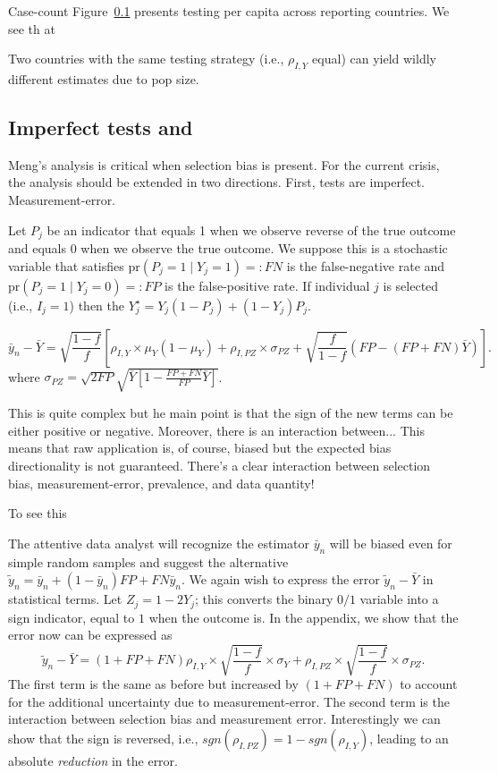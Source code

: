 \documentclass[12pt]{article}
\numberwithin{equation}{section}
\theoremstyle{plain}
\def\pr{\text{pr}}
\begin{document}
Case-count
Figure~\ref{} presents testing per capita across reporting countries.  We see th at

Two countries with the same testing strategy (i.e., $\rho_{I,Y}$ equal) can yield wildly different estimates due to pop size.

\subsection{Imperfect tests and }

Meng's analysis is critical when selection bias is present.  For the current crisis, the analysis should be extended in two directions.  First, tests are imperfect. Measurement-error.

Let $P_j$ be an indicator that equals 1 when we observe reverse of the true outcome and equals 0 when we observe the true outcome. We suppose this is a stochastic variable that satisfies $\pr(P_j = 1 \mid Y_j = 1) =: FN$ is the false-negative rate and $\pr(P_j = 1 \mid Y_j = 0) =: FP$ is the false-positive rate.  If individual $j$ is selected (i.e., $I_j = 1$) then the  $Y_j^\star = Y_j(1-P_j) + (1-Y_j) P_j$.

$$
\bar y_n - \bar Y = \sqrt{\frac{1-f}{f}} \left[ \rho_{I,Y} \times \mu_Y (1-\mu_Y) + \rho_{I,PZ} \times \sigma_{PZ} + \sqrt{\frac{f}{1-f}}  \left( FP - (FP+FN) \bar Y \right) \right] .
$$
where $\sigma_{PZ} = \sqrt{2 FP} \sqrt{\bar Y \left[ 1 - \frac{FP+FN}{FP} \bar Y \right]}$.

This is quite complex but he main point is that the sign of the new terms can be either positive or negative.  Moreover, there is an interaction between...
This means that raw application is, of course, biased but the expected bias directionality is not guaranteed.  There's a clear interaction between selection bias, measurement-error, prevalence, and data quantity!

To see this


The attentive data analyst will recognize the estimator $\bar y_n$ will be biased even for simple random samples and suggest the alternative $\tilde y_n = \bar y_n + (1-\bar y_n) FP + FN \bar y_n$. We again wish to express the error $\tilde  y_n - \bar Y$ in statistical terms.  Let $Z_j = 1 - 2Y_j$; this converts the binary $0/1$ variable into a sign indicator, equal to $1$ when the outcome is.  In the appendix, we show that the error now can be expressed as
$$
\tilde y_n - \bar Y = (1+FP+FN) \rho_{I,Y} \times \sqrt{\frac{1-f}{f}} \times \sigma_{Y} + \rho_{I,PZ} \times \sqrt{\frac{1-f}{f}} \times \sigma_{PZ}.
$$
The first term is the same as before but increased by $(1 + FP + FN)$ to account for the additional uncertainty due to measurement-error.  The second term is the interaction between selection bias and measurement error.  Interestingly we can show that the sign is reversed, i.e., $sgn(\rho_{I,PZ}) = 1 - sgn(\rho_{I,Y})$, leading to an absolute \emph{reduction} in the error.
\end{document}
